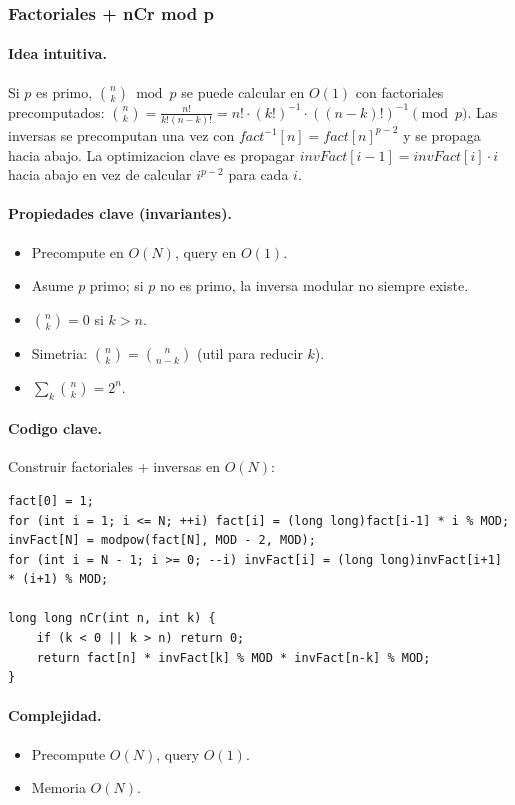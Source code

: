 ﻿\subsubsection{Factoriales + nCr mod p}

\paragraph{Idea intuitiva.}
Si $p$ es primo, $\binom{n}{k} \bmod p$ se puede calcular en $O(1)$ con factoriales precomputados: $\binom{n}{k} = \frac{n!}{k! (n-k)!} = n! \cdot (k!)^{-1} \cdot ((n-k)!)^{-1} \pmod p$. Las inversas se precomputan una vez con $fact^{-1}[n] = fact[n]^{p-2}$ y se propaga hacia abajo. La optimizacion clave es propagar $invFact[i-1] = invFact[i] \cdot i$ hacia abajo en vez de calcular $i^{p-2}$ para cada $i$.

\paragraph{Propiedades clave (invariantes).}
\begin{itemize}\setlength\itemsep{0pt}
	\item Precompute en $O(N)$, query en $O(1)$.
	\item Asume $p$ primo; si $p$ no es primo, la inversa modular no siempre existe.
	\item $\binom{n}{k} = 0$ si $k > n$.
	\item Simetria: $\binom{n}{k} = \binom{n}{n-k}$ (util para reducir $k$).
	\item $\sum_k \binom{n}{k} = 2^n$.
\end{itemize}

\paragraph{Codigo clave.}
Construir factoriales + inversas en $O(N)$:
\begin{verbatim}
fact[0] = 1;
for (int i = 1; i <= N; ++i) fact[i] = (long long)fact[i-1] * i % MOD;
invFact[N] = modpow(fact[N], MOD - 2, MOD);
for (int i = N - 1; i >= 0; --i) invFact[i] = (long long)invFact[i+1] * (i+1) % MOD;

long long nCr(int n, int k) {
    if (k < 0 || k > n) return 0;
    return fact[n] * invFact[k] % MOD * invFact[n-k] % MOD;
}
\end{verbatim}

\paragraph{Complejidad.}
\begin{itemize}\setlength\itemsep{0pt}
	\item Precompute $O(N)$, query $O(1)$.
	\item Memoria $O(N)$.
\end{itemize}


